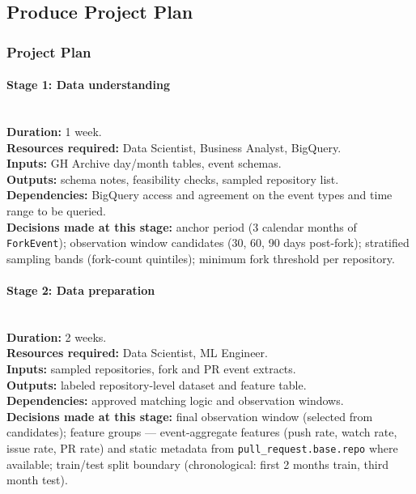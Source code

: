 \subsection{Produce Project Plan}

\subsubsection{Project Plan}
\paragraph{Stage 1: Data understanding}\mbox{}\\
\textbf{Duration:} 1 week.\\
\textbf{Resources required:} Data Scientist, Business Analyst, BigQuery.\\
\textbf{Inputs:} GH Archive day/month tables, event schemas.\\
\textbf{Outputs:} schema notes, feasibility checks, sampled repository list.\\
\textbf{Dependencies:} BigQuery access and agreement on the event types and time range to be queried.\\
\textbf{Decisions made at this stage:} anchor period (3 calendar months of \texttt{ForkEvent}); observation window candidates (30, 60, 90 days post-fork); stratified sampling bands (fork-count quintiles); minimum fork threshold per repository.

\paragraph{Stage 2: Data preparation}\mbox{}\\
\textbf{Duration:} 2 weeks.\\
\textbf{Resources required:} Data Scientist, ML Engineer.\\
\textbf{Inputs:} sampled repositories, fork and PR event extracts.\\
\textbf{Outputs:} labeled repository-level dataset and feature table.\\
\textbf{Dependencies:} approved matching logic and observation windows.\\
\textbf{Decisions made at this stage:} final observation window (selected from candidates); feature groups --- event-aggregate features (push rate, watch rate, issue rate, PR rate) and static metadata from \texttt{pull\_request.base.repo} where available; train/test split boundary (chronological: first 2 months train, third month test).

